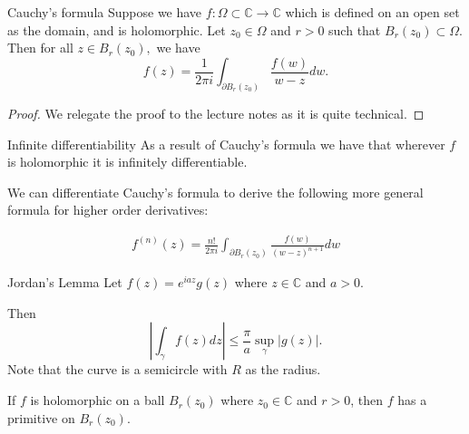 \documentclass{article}
\begin{document}
        \begin{thrm}{Cauchy's formula}{}   
        Suppose we have \( f: \Omega \subset \mathbb{C}  \to \mathbb{C}  \) which is defined on an open set as the domain, and is holomorphic. Let \( z_0 \in \Omega  \) and \( r > 0 \) such that \( B_r(z_0) \subset \Omega  \). Then for all \( z \in B_ r(z_0), \) we have 
        \[
            f(z) = \frac{1}{2\pi i}\int _{\partial B_r(z_0)}\frac{f(w)}{w - z}dw. 
        \]
        
        \tcbline
        \begin{proof}
        We relegate the proof to the lecture notes as it is quite technical. 
        \end{proof}
        
        \end{thrm}


        \begin{cor}{Infinite differentiability}{}
            As a result of Cauchy's formula we have that wherever \( f \) is holomorphic it is infinitely differentiable. 
            
            We can differentiate Cauchy's formula to derive the following more general formula for higher order derivatives:
            
            \begin{align*}
                \boxed{f^{(n)}(z) = \frac{n!}{2\pi i}\int _{\partial B_r(z_0) } \frac{f(w)}{(w - z)^{n+ 1} } dw }
            \end{align*}
            
            \end{cor}
            
            \begin{lem}{Jordan's Lemma}{}
            Let \( f(z) = e^{iaz}g(z)  \)  where \( z \in \mathbb{C} \) and \( a > 0 \).
            
            Then
            \[
                \left\lvert \int _\gamma f(z) dz \right\rvert \leq \frac{\pi}{a}\sup _{\gamma }\left\lvert g(z) \right\rvert .
            \]
            Note that the curve is a semicircle with \( R \) as the radius.
            \end{lem}
            \begin{thrm}{}{}
                If \( f \) is holomorphic on a ball \( B_r(z_0) \) where \( z_0 \in \mathbb{C}  \) and \( r>0 \), then \( f \) has a primitive on \( B_r(z_0) \).
                \end{thrm}
                
\end{document}
